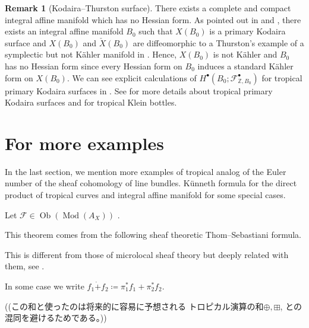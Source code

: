 \documentclass[a4paper,dvipdfmx,reqno,12pt]{amsart}
\theoremstyle{definition}
\newtheorem{remark}[theorem]{Remark}
\newcommand{\deq}{\coloneqq}
\newcommand{\mcal}[1]{\mathcal{#1}}%
\newcommand{\opn}[1]{\operatorname{#1}}
\numberwithin{equation}{section}
\begin{document}
\begin{remark}[{Kodaira--Thurston surface}]
There exists a complete and compact integral affine manifold
  which has no Hessian form.
As pointed out in \cite[Example 1.14]{grossMirrorSymmetryLogarithmic2006a}
and \cite[p.403]{MR1461965}, there exists an integral affine manifold
$B_0$ such that
$X(B_0)$ is a primary Kodaira surface and $X(B_0)$
and $\check{X}(B_0)$
are diffeomorphic to a Thurston's example of a symplectic but
not K\"ahler manifold in \cite{MR402764}.
Hence, $X(B_0)$ is not K\"ahler and $B_0$ has no
Hessian form since every Hessian form on $B_0$ induces a 
standard K\"ahler form
on $X(B_0)$.
We can see explicit calculations of 
$H^{\bullet}(B_0;\mathcal{F}_{\mathbb{Z},B_0}^{\bullet})$
for tropical primary Kodaira surfaces in \cite{maehara2023}.
See \cite{MR1422337} for more details about tropical 
primary Kodaira surfaces and 
\cite{MR3079343,MR3894860} for tropical Klein bottles.

\end{remark}

\section{For more examples}
In the last section, we mention more examples of 
tropical analog of the Euler number of 
the sheaf cohomology of line bundles.
 K\"unneth formula for
the direct product of tropical curves and 
integral affine manifold for some special cases.





Let $\mcal{F}\in \opn{Ob}(\opn{Mod}(A_X))$ 
\cite[Proposition 2.4.12]{MR1299726}.

This theorem comes from the following sheaf 
theoretic Thom--Sebastiani formula.



This is different from those of microlocal sheaf theory \cite[Definition 4.2.2, Definition 4.3.1]{MR1299726} but deeply related with them,
see \cite[Remark 1.1.1]{MR2031639}.



In some case we write $f_1\dot{+} f_2\deq \pi_1^{*}f_1+\pi_2^{*}f_2$.

((この和と使ったのは将来的に容易に予想される
トロピカル演算の和$\oplus, \boxplus$,
との混同を避けるためである。))
\end{document}
